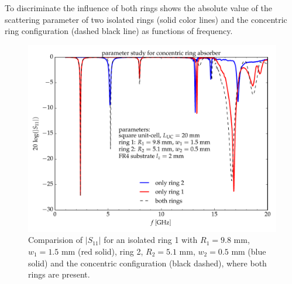 To discriminate the influence of both rings  shows the absolute value of the scattering parameter of two isolated rings (solid color lines) and the concentric ring configuration (dashed black line) as functions of frequency.

\begin{figure}
\centering
\includegraphics[width=0.75\linewidth]{./media/wifi_absorber_single_double_rings.pdf}
\caption{Comparision of $|S_{11}|$ for an isolated ring 1 with $R_1=9.8$ mm, $w_1=1.5$ mm (red solid), ring 2, $R_2=5.1$ mm, $w_2=0.5$ mm (blue solid) and the concentric configuration (black dashed), where both rings are present.}
\label{fig:single_double_rings}
\end{figure}
